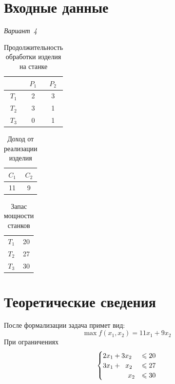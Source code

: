 \documentclass[a4paper,12pt,notitlepage,headsepline,pdftex]{scrartcl}
\begin{document}
\section{Входные данные}
  \hfill\emph{Вариант~4}
  \begin{table}[h]
    \centering
    \begin{tabular}{|c|cc|}
      \hline
        & $P_1$ & $P_2$\\
      \hline
      $T_1$ & 2 & 3\\
      $T_2$ & 3 & 1\\
      $T_3$ & 0 & 1\\
      \hline
    \end{tabular}
    \caption{Продолжительность обработки изделия на станке}
    \label{tab:duration}
  \end{table}

  \begin{table}[h!]
    \centering
    \begin{tabular}{|cc|}
      \hline
      $C_1$ & $C_2$\\
      \hline
      11 & 9\\
      \hline
    \end{tabular}
    \caption{Доход от реализации изделия}
    \label{tab:income}
  \end{table}

  \begin{table}[h!]
    \centering
    \begin{tabular}{|c|c|}
      \hline
      $T_1$ & 20\\
      $T_2$ & 27\\
      $T_3$ & 30\\
      \hline
    \end{tabular}
    \caption{Запас мощности станков}
    \label{tab:reserve}
  \end{table}

  \newpage
\section{Теоретические сведения}
  После формализации задача примет вид:
  \begin{equation}
    \label{eq:maxf}
    \max f\left( x_1, x_2 \right) = 11 x_1 + 9 x_2
  \end{equation}
  При ограничениях
  \begin{equation}
    \label{eq:cases}
    \begin{cases}
      2 x_1 + 3 x_2 &\leqslant 20\\
      3 x_1 + \hspace{0.2cm}x_2 &\leqslant 27\\
      \hspace{1.3cm}  x_2 &\leqslant 30
    \end{cases}
  \end{equation}
  \newpage
\end{document}

